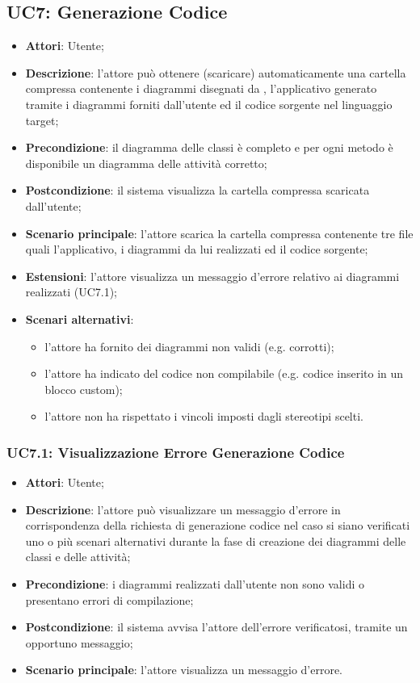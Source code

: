 \subsection{UC7: Generazione Codice}
\label{UC7}
\begin{itemize}
	\item \textbf{Attori}: Utente;
	\item \textbf{Descrizione}: l'attore può ottenere (scaricare) automaticamente una cartella compressa contenente i diagrammi disegnati da \proj{}, l'applicativo generato tramite i diagrammi forniti dall'utente ed il codice sorgente nel linguaggio target;
	\item \textbf{Precondizione}: il diagramma delle classi è completo e per ogni metodo è disponibile un diagramma delle attività corretto;
	\item \textbf{Postcondizione}: il sistema visualizza la cartella compressa scaricata dall'utente;
	\item \textbf{Scenario principale}: l'attore scarica la cartella compressa contenente tre file quali l'applicativo, i diagrammi da lui realizzati ed il codice sorgente;
	\item \textbf{Estensioni}: l'attore visualizza un messaggio d'errore relativo ai diagrammi realizzati (UC7.1);
	\item \textbf{Scenari alternativi}:
	\begin{itemize}
	  \item l'attore ha fornito dei diagrammi non validi (e.g. corrotti);
		\item l'attore ha indicato del codice non compilabile (e.g. codice inserito in un blocco custom);
		\item l'attore non ha rispettato i vincoli imposti dagli stereotipi scelti.
	\end{itemize}
\end{itemize}

\subsubsection{UC7.1: Visualizzazione Errore Generazione Codice}
\label{UC7.1}
\begin{itemize}
	\item \textbf{Attori}: Utente;
	\item \textbf{Descrizione}: l'attore può visualizzare un messaggio d'errore in corrispondenza della richiesta di generazione codice nel caso si siano verificati uno o più scenari alternativi durante la fase di creazione dei diagrammi delle classi e delle attività;
	\item \textbf{Precondizione}: i diagrammi realizzati dall'utente non sono validi o presentano errori di compilazione;%
	\item \textbf{Postcondizione}: il sistema avvisa l'attore dell'errore verificatosi, tramite un opportuno messaggio;
	\item \textbf{Scenario principale}: l'attore visualizza un messaggio d'errore.
\end{itemize}



